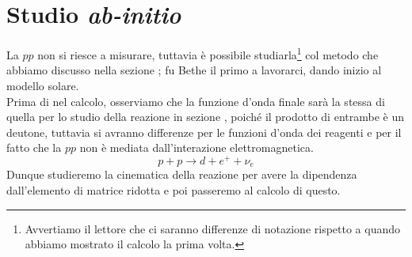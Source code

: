 \section{Studio \textit{ab-initio}}\label{0331-sec-studioab}
La $pp$ non si riesce a misurare, tuttavia è possibile studiarla\footnote{Avvertiamo il lettore che ci saranno differenze di notazione rispetto a quando abbiamo mostrato il calcolo la prima volta.} col metodo che abbiamo discusso nella sezione ; fu Bethe il primo a lavorarci, dando inizio al modello solare.\\
Prima di  nel calcolo, osserviamo che la funzione d'onda finale sarà la stessa di quella per lo studio della reazione in sezione , poiché il prodotto di entrambe è un deutone, tuttavia si avranno differenze per le funzioni d'onda dei reagenti e per il fatto che la $pp$ non è mediata dall'interazione elettromagnetica.
$$p+p \to d+e^++\nu_e$$
Dunque studieremo la cinematica della reazione per avere la dipendenza dall'elemento di matrice ridotta e poi passeremo al calcolo di questo. 

